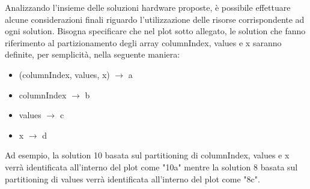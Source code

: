 Analizzando l'insieme delle soluzioni hardware proposte, è possibile effettuare alcune considerazioni finali riguardo l'utilizzazione delle risorse corrispondente ad ogni solution. Bisogna specificare che nel plot sotto allegato, le solution che fanno riferimento al partizionamento degli array columnIndex, values e x saranno definite, per semplicità, nella seguente maniera:
\begin{itemize}
	\item (columnIndex, values, x) $\rightarrow$ a
	\item columnIndex $\rightarrow$ b
	\item values $\rightarrow$ c
	\item x $\rightarrow$ d
\end{itemize} 
Ad esempio, la solution 10 basata sul partitioning di columnIndex, values e x verrà identificata all'interno del plot come "10a" mentre la solution 8 basata sul partitioning di values verrà identificata all'interno del plot come "8c".

